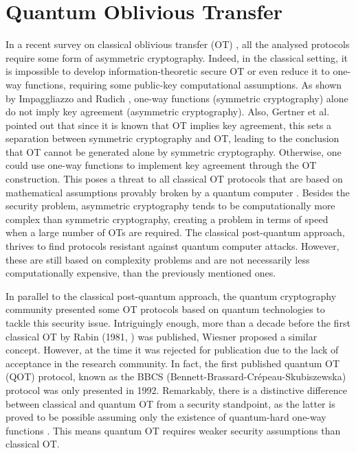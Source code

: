 


%

\chapter{Quantum Oblivious Transfer}


In a recent survey on classical oblivious transfer (OT) \cite{YAVV22}, all the analysed protocols require some form of asymmetric cryptography. Indeed, in the classical setting, it is impossible to develop information-theoretic secure OT or even reduce it to one-way functions, requiring some public-key computational assumptions. As shown by Impaggliazzo and Rudich \cite{IR89}, one-way functions (symmetric cryptography) alone do not imply key agreement (asymmetric cryptography). Also, Gertner et al. \cite{GKMRV00} pointed out that since it is known that OT implies key agreement, this sets a separation between symmetric cryptography and OT, leading to the conclusion that OT cannot be generated alone by symmetric cryptography. Otherwise, one could use one-way functions to implement key agreement through the OT construction. This poses a threat to all classical OT protocols \cite{EGL85, NP01, CO15} that are based on mathematical assumptions provably broken by a quantum computer \cite{Sho95}. Besides the security problem, asymmetric cryptography tends to be computationally more complex than symmetric cryptography, creating a problem in terms of speed when a large number of OTs are required. The classical post-quantum approach, thrives to find protocols resistant against quantum computer attacks. However, these are still based on complexity problems and are not necessarily less computationally expensive, than the previously mentioned ones. 

In parallel to the classical post-quantum approach, the quantum cryptography community presented some OT protocols based on quantum technologies to tackle this security issue. Intriguingly enough, more than a decade before the first classical OT by Rabin (1981, \cite{Rabin81}) was published, Wiesner proposed a similar concept. However, at the time it was rejected for publication due to the lack of acceptance in the research community. In fact, the first published quantum OT (QOT) protocol, known as the BBCS (Bennett-Brassard-Cr{\'e}peau-Skubiszewska) protocol \cite{BBCS92} was only presented in 1992. Remarkably, there is a distinctive difference between classical and quantum OT from a security standpoint, as the latter is proved to be possible assuming only the existence of quantum-hard one-way functions \cite{GLSV21, BCKM21}. This means quantum OT requires weaker security assumptions than classical OT.

